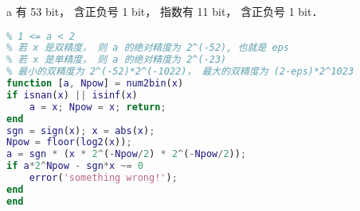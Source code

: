 
a 有 53 bit， 含正负号 1 bit， 指数有 11 bit， 含正负号 1 bit．

\begin{lstlisting}[language=matlab, caption=num2bin.m]
% x = a*2^Npow (精确成立)
% 1 <= a < 2
% 若 x 是双精度， 则 a 的绝对精度为 2^(-52), 也就是 eps
% 若 x 是单精度， 则 a 的绝对精度为 2^(-23)
% 最小的双精度为 2^(-52)*2^(-1022)， 最大的双精度为 (2-eps)*2^1023
function [a, Npow] = num2bin(x)
if isnan(x) || isinf(x)
    a = x; Npow = x; return;
end
sgn = sign(x); x = abs(x);
Npow = floor(log2(x));
a = sgn * (x * 2^(-Npow/2) * 2^(-Npow/2));
if a*2^Npow - sgn*x ~= 0
    error('something wrong!');
end
end
\end{lstlisting}
